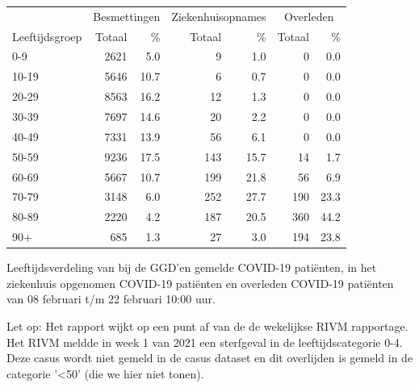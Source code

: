 \documentclass[
  english,
  man,floatsintext]{apa6}
\begin{document}
\begin{table}[H]
\centering\begingroup\fontsize{11}{13}\selectfont

\begin{threeparttable}
\begin{tabular}{lrrrrrr}
\toprule
\multicolumn{1}{c}{ } & \multicolumn{2}{c}{Besmettingen} & \multicolumn{2}{c}{Ziekenhuisopnames} & \multicolumn{2}{c}{Overleden} \\
\cmidrule(l{3pt}r{3pt}){2-3} \cmidrule(l{3pt}r{3pt}){4-5} \cmidrule(l{3pt}r{3pt}){6-7}
Leeftijdsgroep & Totaal & \% & Totaal & \% & Totaal & \%\\
\midrule
0-9 & 2621 & 5.0 & 9 & 1.0 & 0 & 0.0\\
10-19 & 5646 & 10.7 & 6 & 0.7 & 0 & 0.0\\
20-29 & 8563 & 16.2 & 12 & 1.3 & 0 & 0.0\\
30-39 & 7697 & 14.6 & 20 & 2.2 & 0 & 0.0\\
40-49 & 7331 & 13.9 & 56 & 6.1 & 0 & 0.0\\
50-59 & 9236 & 17.5 & 143 & 15.7 & 14 & 1.7\\
60-69 & 5667 & 10.7 & 199 & 21.8 & 56 & 6.9\\
70-79 & 3148 & 6.0 & 252 & 27.7 & 190 & 23.3\\
80-89 & 2220 & 4.2 & 187 & 20.5 & 360 & 44.2\\
90+ & 685 & 1.3 & 27 & 3.0 & 194 & 23.8\\
\bottomrule
\end{tabular}
\begin{tablenotes}
\item[1] Leeftijdsverdeling van bij de GGD’en gemelde COVID-19 patiënten, in het ziekenhuis opgenomen COVID-19 patiënten en overleden COVID-19 patiënten van 08 februari t/m 22 februari 10:00 uur.
\item[2] Let op: Het rapport wijkt op een punt af van de de wekelijkse RIVM rapportage. Het RIVM meldde in week 1 van 2021 een sterfgeval in de leeftijdscategorie 0-4. Deze casus wordt niet gemeld in de casus dataset en dit overlijden is gemeld in de categorie '<50' (die we hier niet tonen).
\end{tablenotes}
\end{threeparttable}
\endgroup{}
\end{table}

\newpage
\end{document}
